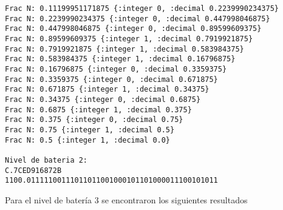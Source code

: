 \documentclass[stu, 12pt, letterpaper, donotrepeattitle, floatsintext, natbib]{apa7}
\begin{document}
\begin{verbatim}
Frac N: 0.11199951171875 {:integer 0, :decimal 0.2239990234375}
Frac N: 0.2239990234375 {:integer 0, :decimal 0.447998046875}
Frac N: 0.447998046875 {:integer 0, :decimal 0.89599609375}
Frac N: 0.89599609375 {:integer 1, :decimal 0.7919921875}
Frac N: 0.7919921875 {:integer 1, :decimal 0.583984375}
Frac N: 0.583984375 {:integer 1, :decimal 0.16796875}
Frac N: 0.16796875 {:integer 0, :decimal 0.3359375}
Frac N: 0.3359375 {:integer 0, :decimal 0.671875}
Frac N: 0.671875 {:integer 1, :decimal 0.34375}
Frac N: 0.34375 {:integer 0, :decimal 0.6875}
Frac N: 0.6875 {:integer 1, :decimal 0.375}
Frac N: 0.375 {:integer 0, :decimal 0.75}
Frac N: 0.75 {:integer 1, :decimal 0.5}
Frac N: 0.5 {:integer 1, :decimal 0.0}

Nivel de bateria 2: 
C.7CED916872B
1100.01111100111011011001000101101000011100101011

\end{verbatim}


Para el nivel de batería 3 se encontraron los siguientes resultados
\end{document}
